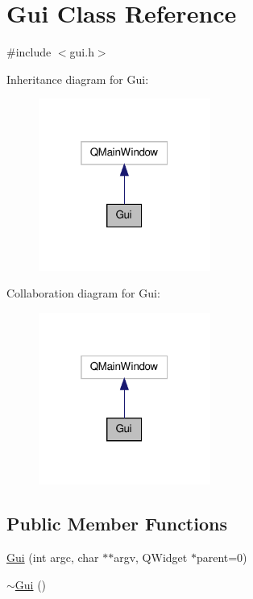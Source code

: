 \hypertarget{classGui}{\section{Gui Class Reference}
\label{classGui}
}


{\ttfamily \#include $<$gui.\-h$>$}



Inheritance diagram for Gui\-:
\nopagebreak
\begin{figure}[H]
\begin{center}
\leavevmode
\includegraphics[width=160pt]{classGui__inherit__graph}
\end{center}
\end{figure}


Collaboration diagram for Gui\-:
\nopagebreak
\begin{figure}[H]
\begin{center}
\leavevmode
\includegraphics[width=160pt]{classGui__coll__graph}
\end{center}
\end{figure}
\subsection*{Public Member Functions}
\begin{DoxyCompactItemize}
\item 
\hyperlink{classGui_a797b7ddfe4c19abb19a37255de3eaefe}{Gui} (int argc, char $\ast$$\ast$argv, Q\-Widget $\ast$parent=0)
\item 
\hyperlink{classGui_a4fd8485d226f9b8a2ac2d81d7f0f3598}{$\sim$\-Gui} ()
\end{DoxyCompactItemize}


